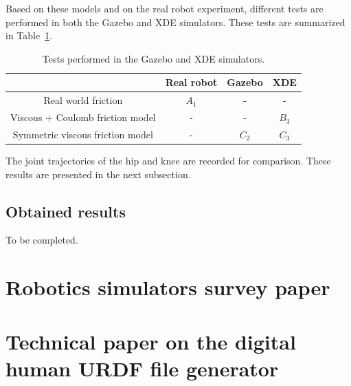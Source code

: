 \documentclass[12pt,a4paper,twoside]{article}
\begin{document}
Based on these models and on the real robot experiment, different tests are performed in both the Gazebo and XDE simulators. These tests are summarized in Table~\ref{tab:simulator-tests}.

\begin{table}[h]
\begin{center}
\begin{tabular}{|c|c|c|c|}
\cline{2-4} 
\multicolumn{1}{c|}{} & Real robot & Gazebo & XDE\tabularnewline
\hline 
Real world friction & $A_1$ & - & -\tabularnewline
\hline 
Viscous + Coulomb friction model & - & - & $B_3$\tabularnewline
\hline 
Symmetric viscous friction model & - & $C_2$ & $C_3$\tabularnewline
\hline 
\end{tabular}
\caption{Tests performed in the Gazebo and XDE simulators.}
\label{tab:simulator-tests}
\end{center}	
\end{table}

The joint trajectories of the hip and knee are recorded for comparison. These results are presented in the next subsection.

\subsection{Obtained results}

To be completed.

\newpage




\newpage{}
\begin{appendices}
\section{Robotics simulators survey paper }
\label{app:survey}
\newpage


\section{Technical paper on the digital human URDF file generator}
\label{app:dhm urdf}
\newpage

\end{appendices}
\end{document}
